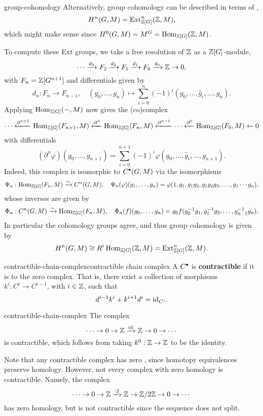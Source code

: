 \begin{example}{group-cohomology}
    Alternatively, group cohomology can be described in terms of ,
    \[ H^n(G, M) = \textup{Ext}^n_{\mathbb{Z}[G]}(\mathbb{Z}, M) , \]
    which might make sense since $H^0(G, M) = M^G = \operatorname{Hom}_{\mathbb{Z}[G]}(\mathbb{Z}, M)$.
    
    To compute these Ext groups, we take a free resolution of $\mathbb{Z}$ as a $\mathbb{Z}[G]$-module,
    \[ \cdots \xrightarrow{d_3} F_2 \xrightarrow{d_2} F_1 \xrightarrow{d_1} F_0 \xrightarrow{d_0} \mathbb{Z} \to 0 , \]
    with $F_n = \mathbb{Z}[G^{n + 1}]$ and differentials given by
    \[ d_n : F_n \to F_{n - 1}, \quad (g_0, \ldots, g_n) \mapsto \sum_{i = 0}^{n} (-1)^i (g_0, \ldots, \widehat{g}_i, \ldots, g_n) . \]
    Applying $\operatorname{Hom}_{\mathbb{Z}[G]}(-, M)$ now gives the (co)complex
    \[ \cdots \xleftarrow{\partial^{n + 1}} \operatorname{Hom}_{\mathbb{Z}[G]}(F_{n + 1}, M) \xleftarrow{\partial^n} \operatorname{Hom}_{\mathbb{Z}[G]}(F_n, M) \xleftarrow{\partial^{n - 1}} \cdots \xleftarrow{\partial^0} \operatorname{Hom}_{\mathbb{Z}[G]}(F_0, M) \leftarrow 0 \]
    with differentials
    \[ (\partial^n \varphi)(g_0, \ldots, g_{n + 1}) = \sum_{i = 0}^{n + 1} (-1)^i \varphi(g_0, \ldots, \widehat{g}_i, \ldots, g_{n + 1}) . \]
    Indeed, this complex is isomorphic to $C^\bdot(G, M)$ via the isomorphisms
    \[ \Psi_n : \operatorname{Hom}_{\mathbb{Z}[G]}(F_n, M) \xrightarrow{\sim} C^n(G, M), \quad \Psi_n(\varphi)(g_1, \ldots, g_n) = \varphi(1, g_1, g_1 g_2, g_1 g_2 g_3, \ldots, g_1 \cdots g_n ) , \]
    whose inverses are given by
    \[ \Phi_n : C^n(G, M) \xrightarrow{\sim} \operatorname{Hom}_{\mathbb{Z}[G]}(F_n, M), \quad \Phi_n(f)(g_0, \ldots, g_n) = g_0 f(g_0^{-1} g_1, g_1^{-1} g_2, \ldots, g_{n - 1}^{-1} g_n) . \]
    In particular the cohomology groups agree, and thus group cohomology is given by
    \[ H^n(G, M) \cong R^i \operatorname{Hom}_{\mathbb{Z}[G]}(\mathbb{Z}, M) = \textup{Ext}^n_{\mathbb{Z}[G]}(\mathbb{Z}, M) . \]
\end{example}

\begin{topic}{contractible-chain-complex}{contractible chain complex}
    A  $C^\bdot$ is \textbf{contractible} if it is  to the zero complex. That is, there exist a collection of morphisms $k^i : C^i \to C^{i - 1}$, with $i \in \mathbb{Z}$, such that
    \[ d^{i - 1} k^i + k^{i + 1} d^i = \textup{id}_{C^i} . \]
\end{topic}

\begin{example}{contractible-chain-complex}
    The complex
    \[ \cdots \to 0 \to \mathbb{Z} \xrightarrow{\textup{id}} \mathbb{Z} \to 0 \to \cdots \]
    is contractible, which follows from taking $k^0 : \mathbb{Z} \to \mathbb{Z}$ to be the identity.
    
    Note that any contractible complex has zero , since homotopy equivalences preserve homology. However, not every complex with zero homology is contractible. Namely, the complex
    \[ \cdots \to 0 \to \mathbb{Z} \xrightarrow{\cdot 2} \mathbb{Z} \to \mathbb{Z} / 2\mathbb{Z} \to 0 \to \cdots \]
    has zero homology, but is not contractible since the sequence does not split.
\end{example}

